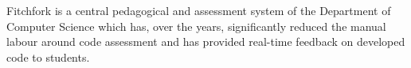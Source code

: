 Fitchfork is a central pedagogical and assessment system of the Department of Computer Science which has, over the years, significantly reduced the manual labour around code assessment and has provided real-time feedback on developed code to students.